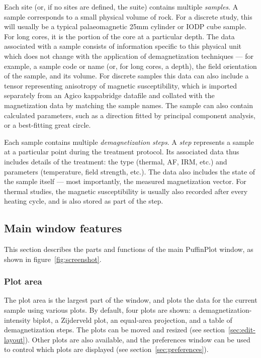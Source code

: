 \documentclass[a4paper,british]{article}
\begin{document}
Each site (or, if no sites are defined, the suite) contains multiple
\emph{samples}. A sample corresponds to a small physical volume of rock. For
a discrete study, this will usually be a typical palaeomagnetic 25mm cylinder
or IODP cube sample. For long cores, it is the portion of the core at a
particular depth. The data associated with a sample consists of information
specific to this physical unit which does not change with the application of
demagnetization techniques --- for example, a sample code or name (or, for
long cores, a depth), the field orientation of the sample, and its volume.
For discrete samples this data can also include a tensor representing
anisotropy of magnetic susceptibility, which is imported separately from an
Agico kappabridge datafile and collated with the magnetization data by
matching the sample names. The sample can also contain calculated parameters,
such as a direction fitted by principal component analysis, or a best-fitting
great circle.

Each sample contains multiple \emph{demagnetization steps}. A \emph{step}
represents a sample at a particular point during the treatment protocol. Its
associated data thus includes details of the treatment: the type (thermal,
AF, IRM, etc.) and parameters (temperature, field strength, etc.). The data
also includes the state of the sample itself --- most importantly, the
measured magnetization vector. For thermal studies, the magnetic
susceptibility is usually also recorded after every heating cycle, and is
also stored as part of the step.

\subsection{Main window features}

This section describes the parts and functions of the main PuffinPlot
window, as shown in figure~\ref{fig:screenshot}.

\subsubsection{Plot area}

The plot area is the largest part of the window, and plots the data for the
current sample using various plots. By default, four plots are shown: a
demagnetization-intensity biplot, a Zijderveld plot, an equal-area
projection, and a table of demagnetization steps. The plots can be moved and
resized (see section~\ref{sec:edit-layout}). Other plots are also
available, and the preferences window can be used to control which plots are
displayed (see section~\ref{sec:preferences}).
\end{document}
